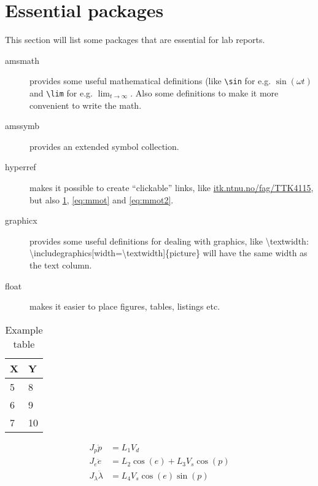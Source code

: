 \section{Essential packages}

This section will list some packages that are essential for lab reports. %

\begin{description}
  \item[amsmath] provides some useful mathematical definitions (like \texttt{\textbackslash{sin}} for e.g. $\sin(\omega t)$ and \texttt{\textbackslash{lim}} for e.g. $\lim_{t\to\infty}$. Also some definitions to make it more convenient to write the math.
  \item[amssymb] provides an extended symbol collection.
  \item[hyperref] makes it possible to create ``clickable'' links, like \url{itk.ntnu.no/fag/TTK4115}, but also \cref{tab:extab}, \cref{eq:mmot} and \cref{eq:mmot2}.
  \item[graphicx] provides some useful definitions for dealing with graphics, like \textbackslash{textwidth}: \textbackslash{includegraphics}[width=\textbackslash{textwidth}]\{picture\} will have the same width as the text column.
  \item[float] makes it easier to place figures, tables, listings etc.
\end{description}
\begin{table}
  \caption{Example table}
  \centering
  \begin{tabular}{ll}
    \hline
    \textbf{X} & \textbf{Y}\\
    \hline
    5 & 8\\
    6 & 9\\
    7 & 10 \\
    \hline
  \end{tabular}
  \label{tab:extab}
\end{table}

\begin{subequations}
  \begin{align}
    J_p\ddot{p} &= L_{1}V_{d} \label{eq:mmot1}\\
    J_e\ddot{e} &= L_{2} \cos(e) + L_3 V_s \cos(p) \label{eq:mmot2}\\
    J_\lambda \ddot{\lambda} &= L_4 V_s \cos(e) \sin(p) \label{eq:mmot3}
  \end{align}
  \label{eq:mmot}
\end{subequations}

